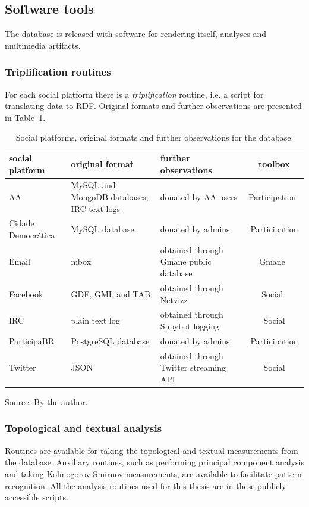 \subsection{Software tools}
The database is released with software for rendering itself, analyses and
multimedia artifacts.
\subsubsection{Triplification routines}
For each social platform there is a \emph{triplification} routine,
i.e. a script for translating data to RDF.
Original formats and further observations are presented in
Table~\ref{tab:provenance}.
\begin{table}[h!]\scriptsize
\begin{center}
\caption{Social platforms, original formats and further observations for
the database.}\label{tab:provenance}
	\def\arraystretch{1.2}
\begin{tabular}{l || p{3cm} | p{3cm} | c}\hline
\textbf{social platform} & \textbf{original format} & \textbf{further observations} & \textbf{toolbox} \\\hline\hline
AA & MySQL and MongoDB databases; IRC text logs & donated by AA users & Participation~\cite{participation} \\\hline
Cidade Democrática & MySQL database & donated by admins & Participation \\\hline
Email & mbox & obtained through Gmane public database & Gmane~\cite{gmane} \\\hline
Facebook & GDF, GML and TAB & obtained through Netvizz~\cite{netvizz} & Social~\cite{social} \\\hline
IRC & plain text log & obtained through Supybot logging & Social \\\hline
ParticipaBR & PostgreSQL database & donated by admins & Participation \\\hline
Twitter & JSON & obtained through Twitter streaming API & Social \\\hline
\end{tabular}
\begin{flushleft}\footnotesize
Source: By the author.\
\end{flushleft}
\end{center}
\end{table} 


\subsubsection{Topological and textual analysis}\label{ana}
Routines are available for taking the topological and textual measurements from
the database.
Auxiliary routines, such as performing principal component analysis
and taking Kolmogorov-Smirnov measurements, are available
to facilitate pattern recognition.
All the analysis routines used for this thesis are in these publicly accessible scripts.

